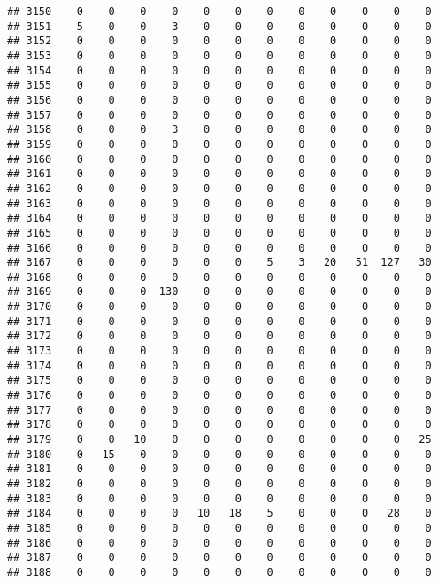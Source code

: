 \documentclass[]{article}
\begin{document}
\begin{verbatim}
## 3150    0    0    0    0    0    0    0    0    0    0    0    0
## 3151    5    0    0    3    0    0    0    0    0    0    0    0
## 3152    0    0    0    0    0    0    0    0    0    0    0    0
## 3153    0    0    0    0    0    0    0    0    0    0    0    0
## 3154    0    0    0    0    0    0    0    0    0    0    0    0
## 3155    0    0    0    0    0    0    0    0    0    0    0    0
## 3156    0    0    0    0    0    0    0    0    0    0    0    0
## 3157    0    0    0    0    0    0    0    0    0    0    0    0
## 3158    0    0    0    3    0    0    0    0    0    0    0    0
## 3159    0    0    0    0    0    0    0    0    0    0    0    0
## 3160    0    0    0    0    0    0    0    0    0    0    0    0
## 3161    0    0    0    0    0    0    0    0    0    0    0    0
## 3162    0    0    0    0    0    0    0    0    0    0    0    0
## 3163    0    0    0    0    0    0    0    0    0    0    0    0
## 3164    0    0    0    0    0    0    0    0    0    0    0    0
## 3165    0    0    0    0    0    0    0    0    0    0    0    0
## 3166    0    0    0    0    0    0    0    0    0    0    0    0
## 3167    0    0    0    0    0    0    5    3   20   51  127   30
## 3168    0    0    0    0    0    0    0    0    0    0    0    0
## 3169    0    0    0  130    0    0    0    0    0    0    0    0
## 3170    0    0    0    0    0    0    0    0    0    0    0    0
## 3171    0    0    0    0    0    0    0    0    0    0    0    0
## 3172    0    0    0    0    0    0    0    0    0    0    0    0
## 3173    0    0    0    0    0    0    0    0    0    0    0    0
## 3174    0    0    0    0    0    0    0    0    0    0    0    0
## 3175    0    0    0    0    0    0    0    0    0    0    0    0
## 3176    0    0    0    0    0    0    0    0    0    0    0    0
## 3177    0    0    0    0    0    0    0    0    0    0    0    0
## 3178    0    0    0    0    0    0    0    0    0    0    0    0
## 3179    0    0   10    0    0    0    0    0    0    0    0   25
## 3180    0   15    0    0    0    0    0    0    0    0    0    0
## 3181    0    0    0    0    0    0    0    0    0    0    0    0
## 3182    0    0    0    0    0    0    0    0    0    0    0    0
## 3183    0    0    0    0    0    0    0    0    0    0    0    0
## 3184    0    0    0    0   10   18    5    0    0    0   28    0
## 3185    0    0    0    0    0    0    0    0    0    0    0    0
## 3186    0    0    0    0    0    0    0    0    0    0    0    0
## 3187    0    0    0    0    0    0    0    0    0    0    0    0
## 3188    0    0    0    0    0    0    0    0    0    0    0    0

\end{verbatim}
\end{document}
